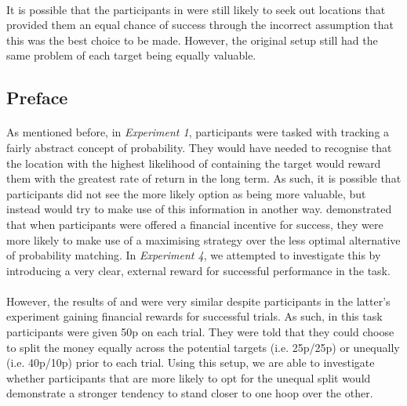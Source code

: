 \documentclass[12pt]{article}
\begin{document}
\paragraph{} It is possible that the participants in \cite{morvan2012human} were still likely to seek out locations that provided them an equal chance of success through the incorrect assumption that this was the best choice to be made. However, the original setup still had the same problem of each target being equally valuable. 


\subsection*{Preface}
\paragraph{} As mentioned before, in \textit{Experiment 1}, participants were tasked with tracking a fairly abstract concept of probability. They would have needed to recognise that the location with the highest likelihood of containing the target would reward them with the greatest rate of return in the long term. As such, it is possible that participants did not see the more likely option as being more valuable, but instead would try to make use of this information in another way. \cite{Goodnow1955} demonstrated that when participants were offered a financial incentive for success, they were more likely to make use of a maximising strategy over the less optimal alternative of probability matching. In \textit{Experiment 4}, we attempted to investigate this by introducing a very clear, external reward for successful performance in the task. 

\paragraph{} However, the results of \cite{clarke2015failure} and \cite{morvan2012human} were very similar despite participants in the latter's experiment gaining financial rewards for successful trials. As such, in this task participants were given 50p on each trial. They were told that they could choose to split the money equally across the potential targets (i.e. 25p/25p) or unequally (i.e. 40p/10p) prior to each trial. Using this setup, we are able to investigate whether participants that are more likely to opt for the unequal split would demonstrate a stronger tendency to stand closer to one hoop over the other.  
\end{document}
